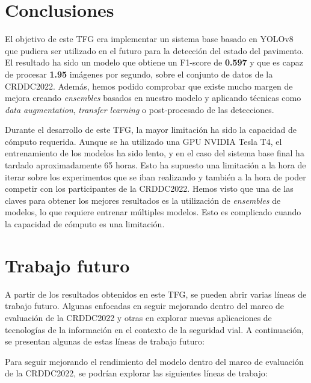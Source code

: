 
\section{Conclusiones\label{SEC:CONC}}
El objetivo de este TFG era implementar un sistema base basado en YOLOv8 que pudiera ser utilizado en el futuro para la detección del estado del pavimento. El resultado ha sido un modelo que obtiene un F1-score de \textbf{0.597} y que es capaz de procesar \textbf{1.95} imágenes por segundo, sobre el conjunto de datos de la CRDDC2022. Además, hemos podido comprobar que existe mucho margen de mejora creando \textit{ensembles} basados en nuestro modelo y aplicando técnicas como \textit{data augmentation}, \textit{transfer learning} o post-procesado de las detecciones.

Durante el desarrollo de este TFG, la mayor limitación ha sido la capacidad de cómputo requerida. Aunque se ha utilizado una GPU NVIDIA Tesla T4, el entrenamiento de los modelos ha sido lento, y en el caso del sistema base final ha tardado aproximadamente 65 horas. Esto ha supuesto una limitación a la hora de iterar sobre los experimentos que se iban realizando y también a la hora de poder competir con los participantes de la CRDDC2022. Hemos visto que una de las claves para obtener los mejores resultados es la utilización de \textit{ensembles} de modelos, lo que requiere entrenar múltiples modelos. Esto es complicado cuando la capacidad de cómputo es una limitación.


\section{Trabajo futuro\label{SEC:TRABFUT}}
A partir de los resultados obtenidos en este TFG, se pueden abrir varias líneas de trabajo futuro. Algunas enfocadas en seguir mejorando dentro del marco de evaluación de la CRDDC2022 y otras en explorar nuevas aplicaciones de tecnologías de la información en el contexto de la seguridad vial. A continuación, se presentan algunas de estas líneas de trabajo futuro:

Para seguir mejorando el rendimiento del modelo dentro del marco de evaluación de la CRDDC2022, se podrían explorar las siguientes líneas de trabajo:

